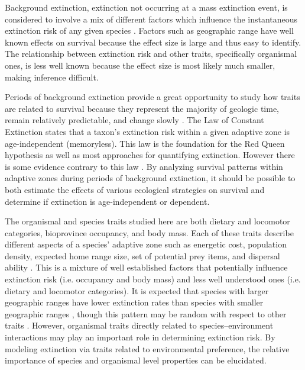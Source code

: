 \documentclass[12pt,letterpaper]{article}
\begin{document}
Background extinction, extinction not occurring at a mass extinction event, is considered to involve a mix of different factors which influence the instantaneous extinction risk of any given species \citep{Jablonski1986,Wang2003,Harnik2013,Kitchell1986,Nurnberg2013a,Payne2007}. Factors such as geographic range have well known effects on survival \citep{Payne2007,Jablonski1987} because the effect size is large and thus easy to identify. The relationship between extinction risk and other traits, specifically organismal ones, is less well known because the effect size is most likely much smaller, making inference difficult.

Periods of background extinction provide a great opportunity to study how traits are related to survival because they represent the majority of geologic time, remain relatively predictable, and change slowly \citep{Jablonski1986,Raup1988}. The Law of Constant Extinction \citep{VanValen1973} states that a taxon's extinction risk within a given adaptive zone is age-independent (memoryless). This law is the foundation for the Red Queen hypothesis as well as most approaches for quantifying extinction. However there is some evidence contrary to this law \citep{Drake2014,Raup1975,Sepkoski1975,Finnegan2008}. By analyzing survival patterns within adaptive zones during periods of background extinction, it should be possible to both estimate the effects of various ecological strategies on survival and determine if extinction is age-independent or dependent. 

The organismal and species traits studied here are both dietary and locomotor categories, bioprovince occupancy, and body mass. Each of these traits describe different aspects of a species' adaptive zone such as energetic cost, population density, expected home range size, set of potential prey items, and dispersal ability \citep{Smith2004,Smith2008b,Damuth1981a,Damuth1979,Jernvall2004,Lyons2005,Lyons2010}. This is a mixture of well established factors that potentially influence extinction risk (i.e. occupancy and body mass) and less well understood ones (i.e. dietary and locomotor categories). It is expected that species with larger geographic ranges have lower extinction rates than species with smaller geographic ranges \citep{Jablonski1986,Harnik2013,Nurnberg2013a,Jablonski2003,Roy2009c}, though this pattern may be random with respect to other traits \citep{Raup1991b}. However, organismal traits directly related to species--environment interactions may play an important role in determining extinction risk. By modeling extinction via traits related to environmental preference, the relative importance of species and organismal level properties can be elucidated. 
\end{document}
